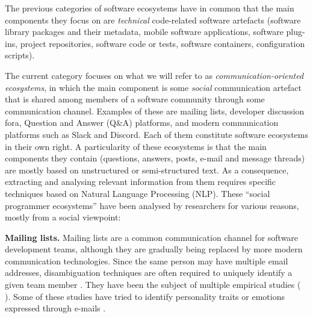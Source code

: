 The previous categories of software ecosystems have in common that the main components they focus on are \emph{technical} code-related software artefacts (\eg software library packages and their metadata, mobile software applications, software plug-ins, project repositories, software code or tests, software containers, configuration scripts).

The current category focuses on what we will refer to as \emph{communication-oriented ecosystems}, in which the main component is some \emph{social} communication artefact that is shared among members of a software community  through some communication channel.
Examples of these are mailing lists, developer discussion fora, Question and Answer (Q\&A) platforms, and modern communication platforms such as Slack and Discord. %
Each of them constitute software ecosystems in their own right.
A particularity of these ecosystems is that the main components they contain (\eg questions, answers, posts, e-mail and message threads) are mostly based on unstructured or semi-structured text. As a consequence, extracting and analysing relevant information from them requires specific techniques based on Natural Language Processing (NLP).
These ``social programmer ecosystems'' \cite{NovielliCL15} have been analysed by researchers for various reasons, mostly from a social viewpoint:

\smallskip
\textbf{Mailing lists.} Mailing lists are a common communication channel for software development teams, although they are gradually being replaced by more modern communication technologies. Since the same person may have multiple email addresses, disambiguation techniques are often required to uniquely identify a given team member \cite{wiese2016mailing}. They have been the subject of multiple empirical studies (\eg
\cite{Guzzi2013-MSR,Zagalsky2018-EMSE}). Some of these studies have tried to identify personality traits or emotions expressed through e-mails \cite{1-082, 2-172, RigbyHassan}.

